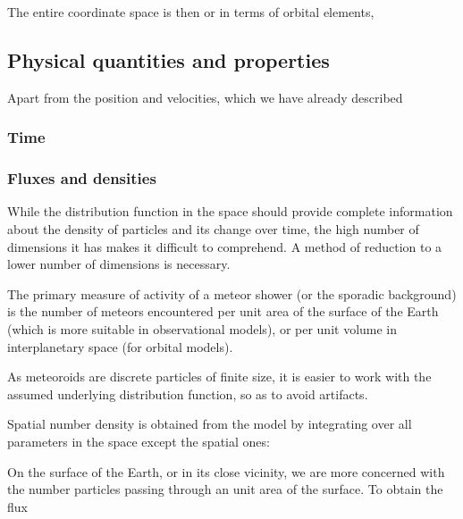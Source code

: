             The entire coordinate space is then
            or in terms of orbital elements,

    \subsection{Physical quantities and properties} \label{mp}
        Apart from the position and velocities, which we have already described

        \subsubsection{Time} \label{msmt}

        \subsubsection{Fluxes and densities} \label{msmf}
            While the distribution function in the space should provide complete information
            about the density of particles and its change over time,
            the high number of dimensions it has makes it difficult to comprehend.
            A method of reduction to a lower number of dimensions is necessary.

            The primary measure of activity of a meteor shower (or the sporadic background) is the number
            of meteors encountered per unit area of the surface of the Earth (which is more suitable
            in observational models), or per unit volume in interplanetary space (for orbital models).

            As meteoroids are discrete particles of finite size, it is easier to work with the
            assumed underlying distribution function, so as to avoid artifacts.

            Spatial number density is obtained from the model by integrating over all parameters
            in the space except the spatial ones:

            On the surface of the Earth, or in its close vicinity, we are more concerned with
            the number particles passing through an unit area of the surface.
            To obtain the flux

